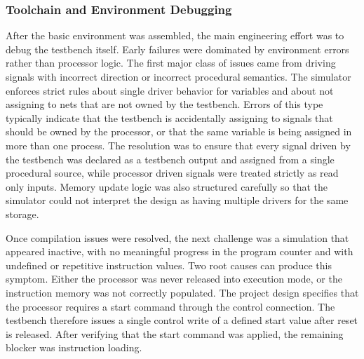 \documentclass[12pt]{article}
\begin{document}
\subsubsection{Toolchain and Environment Debugging}
After the basic environment was assembled, the main engineering effort was to debug the testbench itself. Early failures were dominated by environment errors rather than processor logic. The first major class of issues came from driving signals with incorrect direction or incorrect procedural semantics. The simulator enforces strict rules about single driver behavior for variables and about not assigning to nets that are not owned by the testbench. Errors of this type typically indicate that the testbench is accidentally assigning to signals that should be owned by the processor, or that the same variable is being assigned in more than one process. The resolution was to ensure that every signal driven by the testbench was declared as a testbench output and assigned from a single procedural source, while processor driven signals were treated strictly as read only inputs. Memory update logic was also structured carefully so that the simulator could not interpret the design as having multiple drivers for the same storage.

Once compilation issues were resolved, the next challenge was a simulation that appeared inactive, with no meaningful progress in the program counter and with undefined or repetitive instruction values. Two root causes can produce this symptom. Either the processor was never released into execution mode, or the instruction memory was not correctly populated. The project design specifies that the processor requires a start command through the control connection. The testbench therefore issues a single control write of a defined start value after reset is released. After verifying that the start command was applied, the remaining blocker was instruction loading.
\end{document}
